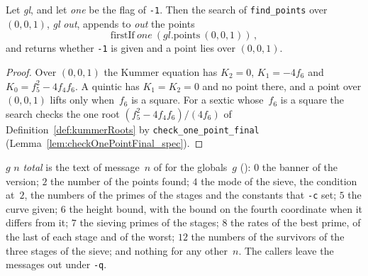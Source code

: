 \begin{lemma}\label{lem:findPointsAtInfinity_spec}
  \leanok
  Let  \textit{gl}, and let \textit{one} be the flag of \texttt{-1}.
  Then the search of \texttt{find\_points} over $(0, 0, 1)$, 
  \textit{gl} \textit{out}, appends to \textit{out} the points
  \[
    \mathrm{firstIf}\ \mathit{one}\ (\mathit{gl}.\mathrm{points}\ (0, 0, 1))\,,
  \]
  and returns whether \texttt{-1} is given and a point lies over $(0, 0, 1)$.
\end{lemma}

\begin{proof}
  \leanok
  Over $(0, 0, 1)$ the Kummer equation has $K_2 = 0$, $K_1 = -4f_6$ and $K_0 = f_5^2 - 4f_4f_6$. A
  quintic has $K_1 = K_2 = 0$ and no point there, and a point over $(0, 0, 1)$ lifts only when~$f_6$
  is a square. For a sextic whose~$f_6$ is a square the search checks the one root $(f_5^2 -
  4f_4f_6)/(4f_6)$ of Definition~\ref{def:kummerRoots} by \texttt{check\_one\_point\_final}
  (Lemma~\ref{lem:checkOnePointFinal_spec}).
\end{proof}

\begin{definition}\label{def:message}
  \leanok
   $g$ $n$ \textit{total} is the text of message~$n$ of \jpoints{} for the
  globals~$g$ (): $0$ the banner of the version; $2$ the number of the
  points found; $4$ the mode of the sieve, the condition at~$2$, the numbers of the primes of the
  stages and the constants that \texttt{-c} set; $5$ the curve given; $6$ the height bound, with the
  bound on the fourth coordinate when it differs from it; $7$ the sieving primes of the stages; $8$
  the rates of the best prime, of the last of each stage and of the worst; $12$ the numbers of the
  survivors of the three stages of the sieve; and nothing for any other~$n$. The callers leave the
  messages out under \texttt{-q}.
\end{definition}

